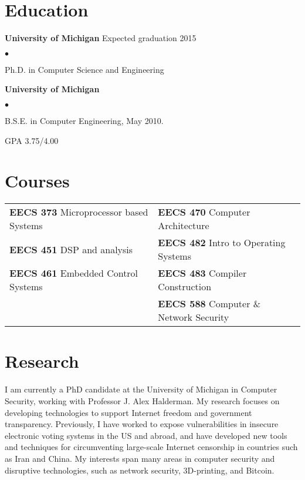 \documentclass{res}
\newcommand{\sqitem}{\item[\tiny$\blacksquare$]}
\newcommand{\sqlist}{\begin{list}{$\bullet$}
  { \setlength{\itemsep}{0pt}
	\setlength{\parsep}{0pt}
	\setlength{\topsep}{0pt}
	\setlength{\partopsep}{0pt}
	\setlength{\leftmargin}{6.0em}
	\setlength{\labelsep}{2.5em} } }
\newcommand{\sqend}{\end{list}}
\begin{document}

\address{\emph{Current Address}	\\
			1885 Fuller Rd	\\
			Ann Arbor, MI 48105			\\
										\\
			phone: 734.330.8702			\\
			email: ewust@umich.edu}

\begin{resume}

\section{Education}
	\textbf{University of Michigan}  Expected graduation 2015%
	\sqlist	
		\sqitem Ph.D. in Computer Science and Engineering 
	\sqend

	\textbf{University of Michigan}
	\sqlist
		\sqitem B.S.E. in Computer Engineering, May 2010.
		\sqitem GPA 3.75/4.00
	\sqend

\section{Courses}
	\begin{tabular}{l l}
	\textbf{EECS 373} Microprocessor based Systems & 
					\textbf{EECS 470} Computer Architecture \\
	\textbf{EECS 451} DSP and analysis & 
					\textbf{EECS 482} Intro to Operating Systems \\
	\textbf{EECS 461} Embedded Control Systems & 
					\textbf{EECS 483} Compiler Construction \\
											  &
					\textbf{EECS 588} Computer \& Network Security \\
	\end{tabular}
\fi

\section{Research}

I am currently a PhD candidate at the University of Michigan in Computer
Security, working with Professor J. Alex Halderman. My research focuses on
developing technologies to support Internet freedom and government
transparency. Previously, I have worked to expose vulnerabilities in insecure
electronic voting systems in the US and abroad, and have developed new tools
and techniques for circumventing large-scale Internet censorship in countries
such as Iran and China. My interests span many areas in computer security and
disruptive technologies, such as network security, 3D-printing, and Bitcoin.


\end{resume}
\end{document}
